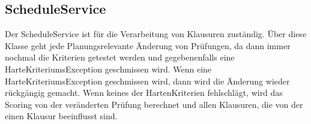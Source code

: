\subsection{ScheduleService}\label{subsec:ScheduleService}
Der ScheduleService ist für die Verarbeitung von Klausuren zuständig.
Über diese Klasse geht jede Planungsrelevante Änderung von Prüfungen,
da dann immer nochmal die Kriterien getestet werden und gegebenenfalls
eine HarteKriteriumsException geschmissen wird.
Wenn eine HarteKriteriumsException geschmissen wird, dann wird die Änderung wieder rückgängig gemacht.
Wenn keines der HartenKriterien fehlschlägt, wird das Scoring von der veränderten Prüfung berechnet
und allen Klausuren, die von der einen Klausur beeinflusst sind.
